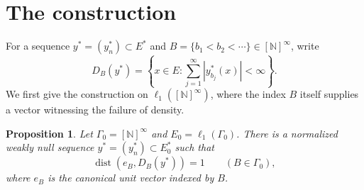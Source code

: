 \documentclass[10pt,a4paper]{amsart}
\newtheorem{proposition}[theorem]{Proposition}
\newcommand{\N}{\mathbb N}
\DeclareMathOperator{\dist}{dist}
\begin{document}
\section{The construction}

For a sequence $y^*=(y_n^*)\subset E^*$ and
$B=\{b_1<b_2<\cdots\}\in[\N]^\infty$, write
\[
 D_B(y^*)=\left\{x\in E:\sum_{j=1}^{\infty}|y_{b_j}^*(x)|<\infty\right\}.
\]
We first give the construction on $\ell_1([\N]^\infty)$, where
the index $B$ itself supplies a vector witnessing the failure of density.

\begin{proposition}\label{prop:construction}
Let $\Gamma_0=[\N]^\infty$ and $E_0=\ell_1(\Gamma_0)$. There is a
normalized weakly null sequence $y^*=(y_n^*)\subset E_0^*$ such that
\[
 \dist(e_B,D_B(y^*))=1\qquad(B\in\Gamma_0),
\]
where $e_B$ is the canonical unit vector indexed by $B$.
\end{proposition}
\end{document}
